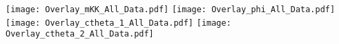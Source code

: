 \documentclass[16pt]{beamer}
\begin{document}
  \begin{frame}
    \centering
    \texttt{[image: Overlay\_mKK\_All\_Data.pdf]}
    \texttt{[image: Overlay\_phi\_All\_Data.pdf]}\\
    \texttt{[image: Overlay\_ctheta\_1\_All\_Data.pdf]}
    \texttt{[image: Overlay\_ctheta\_2\_All\_Data.pdf]}
  \end{frame}
\end{document}

